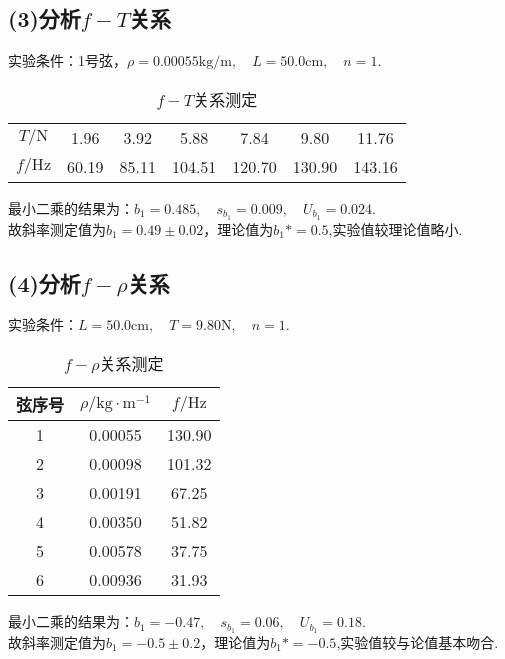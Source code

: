 \documentclass{ctexart}
\begin{document}
\subsection*{(3)分析$f-T$关系}
\noindent 实验条件：1号弦，$\rho=0.00055\mathrm{kg/m},\quad L=50.0\mathrm{cm},\quad n=1$.\\
\begin{table}[h]
  \caption{$f-T$关系测定} \vspace{0.7em}
  \centering
  \begin{tabular}{ccccccc}
    \hline
    $T/\mathrm{N}$& 1.96 & 3.92& 5.88& 7.84& 9.80& 11.76\\
    $f/\mathrm{Hz}$& 60.19& 85.11 & 104.51& 120.70  & 130.90 &143.16\\
    \hline
    \end{tabular}
\end{table}

\noindent 最小二乘的结果为：$b_1=0.485
,\quad s_{b_1}=0.009, \quad U_{b_1}=0.024$. \\
故斜率测定值为$b_1=0.49\pm0.02$，理论值为$b_1*=0.5$,实验值较理论值略小.\\

\subsection*{(4)分析$f-\rho$关系}
\noindent 实验条件：$L=50.0\mathrm{cm},\quad T=9.80\mathrm{N},\quad n=1$.\\
\begin{table}[!htbp]
  \centering
  \caption{$f-\rho$关系测定}\vspace{0.7em} \label{tab:aStrangeTable}%
  \begin{tabular}{ccc}
  \toprule
  弦序号& $\rho/\mathrm{kg\cdot m^{-1}}$& $f/\mathrm{Hz}$ \\
  \midrule
  1& 0.00055& 130.90  \\
  2& 0.00098& 101.32  \\
  3& 0.00191& 67.25  \\
  4& 0.00350& 51.82  \\
  5& 0.00578& 37.75  \\
  6& 0.00936& 31.93  \\
  \bottomrule
  \end{tabular}
  \end{table}

  \noindent 最小二乘的结果为：$b_1=-0.47
  ,\quad s_{b_1}=0.06, \quad U_{b_1}=0.18$. \\
故斜率测定值为$b_1=-0.5\pm0.2$，理论值为$b_1*=-0.5$,实验值较与论值基本吻合.\\
\end{document}
